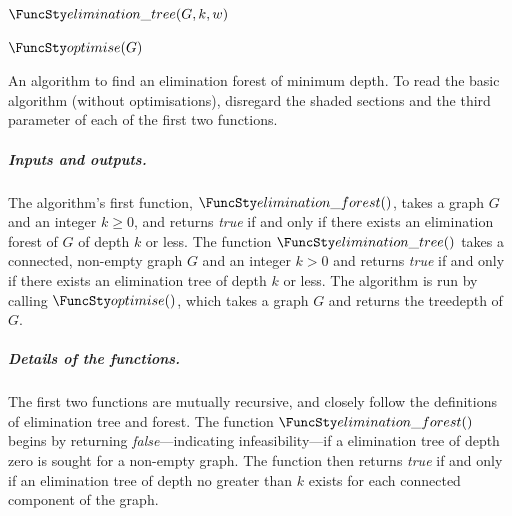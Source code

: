 {{\begin{algorithm}[htb]
    \vspace{.5em}

    \nl $\TDConnected(G,k,w)$ \label{td_connected_fun} \;
    \nl {}
    \nl {}
    \nl {}

    \vspace{.5em}

    \nl $\TDOptimise(G)$ \label{td_optimise_fun} \;
    \nl {}
    \nl {}
    \nl {}
    \caption{An algorithm to find an elimination forest of minimum depth.  To read the basic algorithm
    (without optimisations), disregard the shaded sections and the third parameter
    of each of the first two functions.}
    \label{TheAlgorithm}
    \end{algorithm}
    }

    \subparagraph*{Inputs and outputs.}
    The algorithm's first function, $\TDGeneral()$, takes a graph $G$ and an integer $k \geq 0$, and returns
    \emph{true} if and only if there exists an elimination forest of $G$ of depth $k$ or less.  The function
    $\TDConnected()$ takes a connected, non-empty graph $G$ and an integer $k > 0$ and returns \emph{true}
    if and only if there exists an elimination tree of depth $k$ or less.
    The algorithm is run by calling $\TDOptimise()$, which takes a graph $G$ and returns the treedepth of $G$.

    \subparagraph*{Details of the functions.}
    The first two functions are mutually recursive, and closely follow
    the definitions of elimination tree and forest.
    The function $\TDGeneral()$ begins by returning \emph{false}---indicating
    infeasibility---if a elimination tree of depth zero is sought for a non-empty graph.
    The function then returns \emph{true} if and only if an elimination tree of depth no greater
    than $k$ exists for each connected component of the graph.

}
